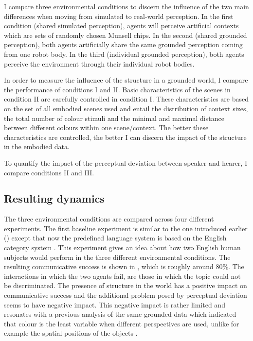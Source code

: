 I compare three environmental conditions to discern the influence of
the two main differences when moving from simulated to real-world
perception. In the first condition (shared simulated perception),
agents will perceive artificial contexts which are sets of randomly
chosen Munsell chips. In the second (shared grounded perception), both
agents artificially share the same grounded perception coming from one
robot body. In the third (individual grounded perception), both agents
perceive the environment through their individual robot bodies.

In order to measure the influence of the structure in a grounded
world, I compare the performance of conditions I and II. Basic
characteristics of the scenes in condition II are carefully controlled
in condition I. These characteristics are based on the set of all
embodied scenes used and entail the distribution of context sizes, the
total number of colour stimuli and the minimal and maximal distance
between different colours within one scene/context. The better these
characteristics are controlled, the better I can discern the impact of
the structure in the embodied data.

To quantify the impact of the perceptual deviation between speaker and
hearer, I compare conditions II and III.

\subsection{Resulting dynamics}

The three environmental conditions are compared across four different
experiments. The first baseline experiment is similar to the one
introduced earlier () except
that now the predefined language system is based on the English
category system \citep{sturges95location}. This experiment gives an
idea about how two English human subjects would perform in the three
different environmental conditions. The resulting communicative
success is shown in ,
which is roughly around 80\%. The interactions in which the two agents
fail, are those in which the topic could not be discriminated. The
presence of structure in the world has a positive impact on
communicative success and the additional problem posed by perceptual
deviation seems to have negative impact. This negative impact is
rather limited and resonates with a previous analysis of the same
grounded data which indicated that colour is the least variable when
different perspectives are used, unlike for example the spatial
positions of the objects \citep{wellens08flexible}.

